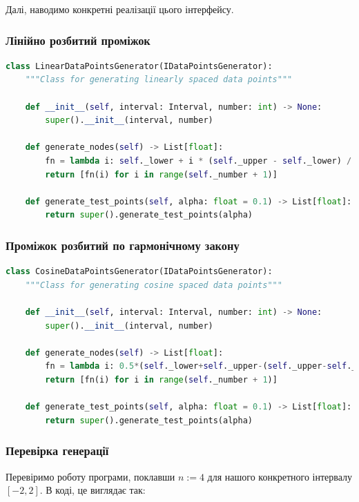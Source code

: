 \documentclass[12pt]{extarticle}
\begin{document}
Далі, наводимо конкретні реалізації цього інтерфейсу.

\subsubsection{Лінійно розбитий проміжок}
\begin{lstlisting}[language=Python, caption=Генерація лінійно розкинутих точок]
class LinearDataPointsGenerator(IDataPointsGenerator):
    """Class for generating linearly spaced data points"""
    
    def __init__(self, interval: Interval, number: int) -> None:
        super().__init__(interval, number)
    
    def generate_nodes(self) -> List[float]:
        fn = lambda i: self._lower + i * (self._upper - self._lower) / (self._number)
        return [fn(i) for i in range(self._number + 1)]
    
    def generate_test_points(self, alpha: float = 0.1) -> List[float]:
        return super().generate_test_points(alpha)
\end{lstlisting}

\subsubsection{Проміжок розбитий по гармонічному закону}
\begin{lstlisting}[language=Python, caption=Генерація точок по закону з косинусом]
class CosineDataPointsGenerator(IDataPointsGenerator):
    """Class for generating cosine spaced data points"""
    
    def __init__(self, interval: Interval, number: int) -> None:
        super().__init__(interval, number)
        
    def generate_nodes(self) -> List[float]:
        fn = lambda i: 0.5*(self._lower+self._upper-(self._upper-self._lower)*cos((2*i+1)*pi/(2*(self._number+1))))
        return [fn(i) for i in range(self._number + 1)]

    def generate_test_points(self, alpha: float = 0.1) -> List[float]:
        return super().generate_test_points(alpha)
\end{lstlisting}

\subsubsection{Перевірка генерації}
Перевіримо роботу програми, поклавши $n:=4$ для нашого конкретного інтервалу $[-2,2]$. В коді, це виглядає так:
\end{document}
